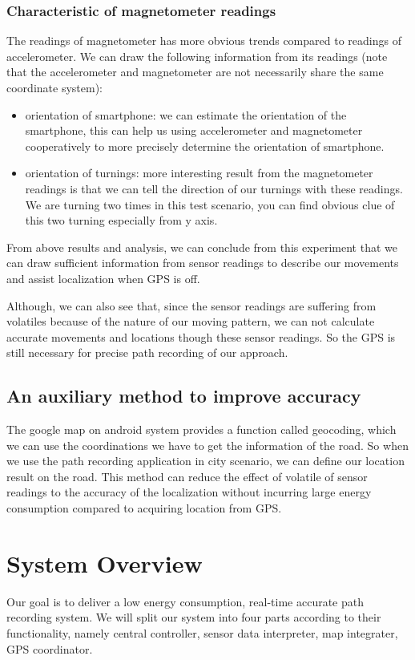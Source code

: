 \documentclass[journal]{IEEEtran}
\begin{document}
\subsubsection{Characteristic of magnetometer readings} 
The readings of magnetometer has more obvious trends compared to readings of accelerometer. 
We can draw the following information from its readings (note that the accelerometer and magnetometer are not necessarily share the same coordinate system):

\begin{itemize}
	\item orientation of smartphone: 
		we can estimate the orientation of the smartphone, this can help us using accelerometer and magnetometer cooperatively to more precisely determine the orientation of smartphone.
	\item orientation of turnings: 
		more interesting result from the magnetometer readings is that we can tell the direction of our turnings with these readings. 
		We are turning two times in this test scenario, you can find obvious clue of this two turning especially from y axis.
\end{itemize}

From above results and analysis, we can conclude from this experiment that we can draw sufficient information from sensor readings to describe our movements and assist localization when GPS is off. 

Although, we can also see that, since the sensor readings are suffering from volatiles because of the nature of our moving pattern, we can not calculate accurate movements and locations though these sensor readings.
So the GPS is still necessary for precise path recording of our approach.

\subsection{An auxiliary method to improve accuracy}
The google map on android system provides a function called geocoding, which we can use the coordinations we have to get the information of the road. 
So when we use the path recording application in city scenario, we can define our location result on the road.
This method can reduce the effect of volatile of sensor readings to the accuracy of the localization without incurring large energy consumption compared to acquiring location from GPS.

\section{System Overview}
Our goal is to deliver a low energy consumption, real-time accurate path recording system.
We will split our system into four parts according to their functionality, namely central controller, sensor data interpreter, map integrater, GPS coordinator.
\end{document}
